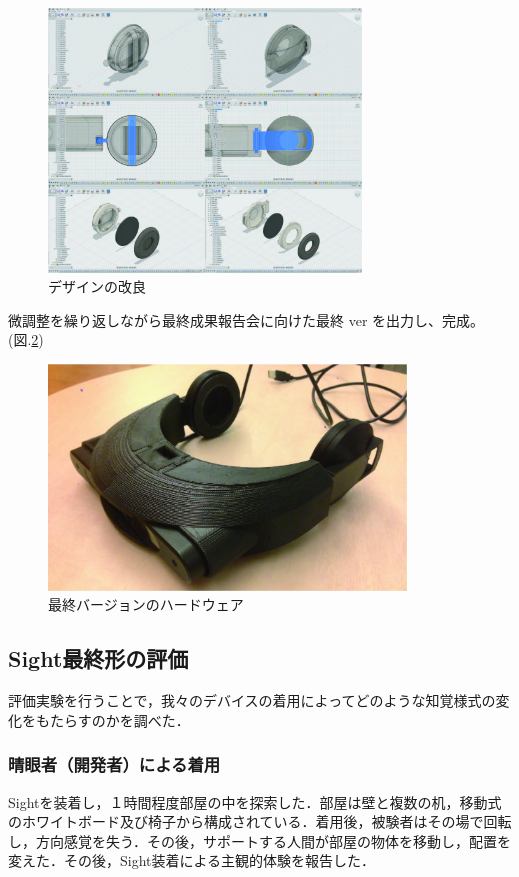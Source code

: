 \begin{figure}[h]
\begin{center}
\includegraphics[height=70mm]{images/hardware/design_6.jpg}
\end{center}
\caption{デザインの改良}
\label{fig:design_6}
\end{figure}

微調整を繰り返しながら最終成果報告会に向けた最終 ver を出力し、完成。(図.\ref{fig:design_7})
\begin{figure}[h]
\begin{center}
\includegraphics[height=60mm]{images/hardware/design_7.jpg}
\end{center}
\caption{最終バージョンのハードウェア}
\label{fig:design_7}
\end{figure}

\subsection{Sight最終形の評価}
評価実験を行うことで，我々のデバイスの着用によってどのような知覚様式の変化をもたらすのかを調べた．
\subsubsection{晴眼者（開発者）による着用}
Sightを装着し，１時間程度部屋の中を探索した．部屋は壁と複数の机，移動式のホワイトボード及び椅子から構成されている．着用後，被験者はその場で回転し，方向感覚を失う．その後，サポートする人間が部屋の物体を移動し，配置を変えた．その後，Sight装着による主観的体験を報告した．

